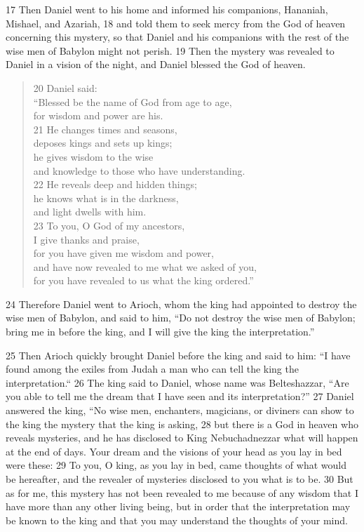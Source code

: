 17 Then Daniel went to his home and informed his companions, Hananiah, Mishael, 
and Azariah, 18 and told them to seek mercy from the God of heaven concerning 
this mystery, so that Daniel and his companions with the rest of the wise men 
of Babylon might not perish. 19 Then the mystery was revealed to Daniel in a 
vision of the night, and Daniel blessed the God of heaven.

\begin{verse}
20 Daniel said: \\
``Blessed be the name of God from age to age, \\
    for wisdom and power are his. \\
21 He changes times and seasons, \\
    deposes kings and sets up kings; \\
he gives wisdom to the wise \\
    and knowledge to those who have understanding. \\
22 He reveals deep and hidden things; \\
    he knows what is in the darkness, \\
    and light dwells with him. \\
23 To you, O God of my ancestors, \\
    I give thanks and praise, \\
for you have given me wisdom and power, \\
    and have now revealed to me what we asked of you, \\
    for you have revealed to us what the king ordered.'' \\
\end{verse}

24 Therefore Daniel went to Arioch, whom the king had appointed to destroy the 
wise men of Babylon, and said to him, ``Do not destroy the wise men of Babylon; 
bring me in before the king, and I will give the king the interpretation.''

25 Then Arioch quickly brought Daniel before the king and said to him: ``I have 
found among the exiles from Judah a man who can tell the king the 
interpretation.`` 26 The king said to Daniel, whose name was Belteshazzar, ``Are 
you able to tell me the dream that I have seen and its interpretation?'' 27 
Daniel answered the king, ``No wise men, enchanters, magicians, or diviners can 
show to the king the mystery that the king is asking, 28 but there is a God in 
heaven who reveals mysteries, and he has disclosed to King Nebuchadnezzar what 
will happen at the end of days. Your dream and the visions of your head as you 
lay in bed were these: 29 To you, O king, as you lay in bed, came thoughts of 
what would be hereafter, and the revealer of mysteries disclosed to you what is 
to be. 30 But as for me, this mystery has not been revealed to me because of any 
wisdom that I have more than any other living being, but in order that the 
interpretation may be known to the king and that you may understand the 
thoughts of your mind.

